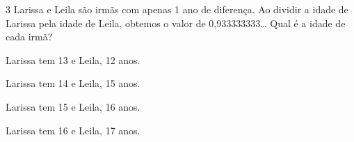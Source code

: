 








\num{3} Larissa e Leila são irmãs com apenas 1 ano de diferença. Ao dividir a
idade de Larissa pela idade de Leila, obtemos o valor de
0,933333333\ldots{} Qual é a idade de cada irmã?

\begin{escolha}
\item Larissa tem 13 e Leila, 12 anos.
\item Larissa tem 14 e Leila, 15 anos.
\item Larissa tem 15 e Leila, 16 anos.
\item Larissa tem 16 e Leila, 17 anos.
\end{escolha}






